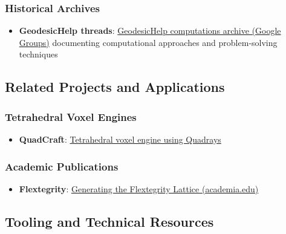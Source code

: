 \documentclass[
  10pt,
]{article}
\providecommand{\tightlist}{%
  \setlength{\itemsep}{0pt}\setlength{\parskip}{0pt}}
\begin{document}
\hypertarget{historical-archives}{%
\subsubsection{Historical Archives}\label{historical-archives}}

\begin{itemize}
\tightlist
\item
  \textbf{GeodesicHelp threads}:
  \href{https://groups.google.com/g/GeodesicHelp/}{GeodesicHelp
  computations archive (Google Groups)} documenting computational
  approaches and problem-solving techniques
\end{itemize}

\hypertarget{related-projects-and-applications}{%
\subsection{Related Projects and
Applications}\label{related-projects-and-applications}}

\hypertarget{tetrahedral-voxel-engines}{%
\subsubsection{Tetrahedral Voxel
Engines}\label{tetrahedral-voxel-engines}}

\begin{itemize}
\tightlist
\item
  \textbf{QuadCraft}:
  \href{https://github.com/docxology/quadcraft/}{Tetrahedral voxel
  engine using Quadrays}
\end{itemize}

\hypertarget{academic-publications}{%
\subsubsection{Academic Publications}\label{academic-publications}}

\begin{itemize}
\tightlist
\item
  \textbf{Flextegrity}:
  \href{https://www.academia.edu/44531954/Generating_the_Flextegrity_Lattice}{Generating
  the Flextegrity Lattice (academia.edu)}
\end{itemize}

\hypertarget{tooling-and-technical-resources}{%
\subsection{Tooling and Technical
Resources}\label{tooling-and-technical-resources}}
\end{document}
